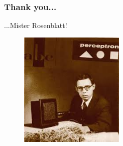 \documentclass[9pt]{beamer}
\theoremstyle{plain} \newtheorem{Theo}{Theorem}[section]
\theoremstyle{plain} \newtheorem{Prop}{Proposition}[section]
\theoremstyle{plain} \newtheorem{Def}{Definition}[section]
\theoremstyle{plain} \newtheorem{Lem}{Lemma}[section]
\begin{document}
\frame
{
\frametitle{Thank you...}
...Mister Rosenblatt!
\vspace{0.2cm}
\begin{figure}
\centering
\includegraphics[width=5cm]{Rosen.jpg}
\end{figure}
}
\end{document}
